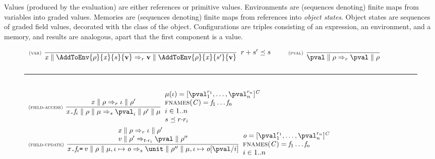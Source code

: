 Values (produced by the evaluation) are either references or primitive values.
Environments are (sequences denoting) finite maps from variables into graded values. Memories are (sequences denoting) finite maps from references into \emph{object states}. Object states are sequences of  graded field values, decorated with the class of the object. Configurations are triples consisting of an expression, an environment, and a memory, and results are analogous, apart that the first component is a value.

\begin{figure}
\begin{math}
\begin{array}{l}
\NamedRule{var}{ }
{ \RedVal{\x}{\AddToEnv{\env}{\x}{\sgr}{\val}}{\rgr}{\val}{\AddToEnv{\env}{\x}{\sgr'}{\val}}}
{\rgr\rsum\sgr'\rord\sgr}
\BigSpace
\NamedRule{pval}{ }
{ \RedVal{\pval}{\env}{\rgr}{\pval}{\env} } 
{} 
\\[3ex]
\end{array}
\end{math}
\hrule
\begin{math}
\begin{array}{l}
\\

\NamedRule{field-access}{
  \RedVal{\x}{\env}{\rgr}{\loc}{\env'}
}{ \reduce{\Conf{\FieldAccess{\x}{\f_i}}{\env}{\mem}}{\sgr}{\Conf{\pval_i}{\env'}{\mem}}}
{ \mem(\loc)=\Obj{\C}{\GradedValInd{\pval}{1}{\rgr},\ldots,\GradedValInd{\pval}{n}{\rgr}}\\
  \fnames{\C}=\f_1\ldots\f_n\\
   i\in 1..n\\ 
\sgr \rord \rgr\rmul\rgr_i
}
\\[5ex]
\NamedRule{field-update}{
  \begin{array}{l}
  \RedVal{\x}{\env}{\rgr}{\loc}{\env'}\\
  \RedVal{\ve}{\env'}{\tgr\rmul\rgr_i}{\pval}{\env''}
  \end{array}
}{ \reduce{\Conf{\FieldUpdate{\x}{\f_i}{\ve}}{\env}{\mem,\MemElem{\loc}{\obj}}}{\sgr}{\Conf{\unit}{\env''}{\mem,\MemElem{\loc}{\Subst{\obj}{\pval}{i}}}}}
{ \obj=\Obj{\C}{\GradedValInd{\pval}{1}{\rgr},\ldots,\GradedValInd{\pval}{n}{\rgr}}\\
  \fnames{\C}=\f_1\ldots\f_n\\
  i\in 1..n
}

\\[4ex]


\end{array}
\end{math}
\end{figure}
